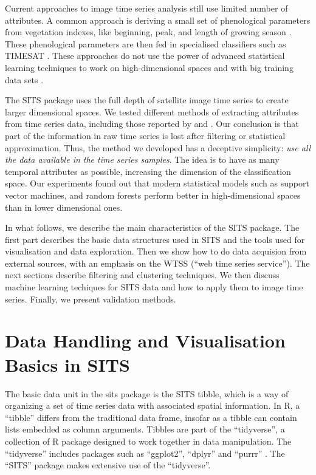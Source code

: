 \documentclass[11pt,]{article}
\begin{document}
Current approaches to image time series analysis still use limited
number of attributes. A common approach is deriving a small set of
phenological parameters from vegetation indexes, like beginning, peak,
and length of growing season \citep{Brown2013} \citep{Kastens2017}
\citep{Estel2015} \citep{Pelletier2016}. These phenological parameters
are then fed in specialised classifiers such as TIMESAT
\citep{Jonsson2004}. These approaches do not use the power of advanced
statistical learning techniques to work on high-dimensional spaces and
with big training data sets \citep{James2013}.

The SITS package uses the full depth of satellite image time series to
create larger dimensional spaces. We tested different methods of
extracting attributes from time series data, including those reported by
\citet{Pelletier2016} and \citet{Kastens2017}. Our conclusion is that
part of the information in raw time series is lost after filtering or
statistical approximation. Thus, the method we developed has a deceptive
simplicity:
\emph{use all the data available in the time series samples}. The idea
is to have as many temporal attributes as possible, increasing the
dimension of the classification space. Our experiments found out that
modern statistical models such as support vector machines, and random
forests perform better in high-dimensional spaces than in lower
dimensional ones.

In what follows, we describe the main characteristics of the SITS
package. The first part describes the basic data structures used in SITS
and the tools used for visualisation and data exploration. Then we show
how to do data acquision from external sources, with an emphasis on the
WTSS (``web time series service''). The next sections describe filtering
and clustering techniques. We then discuss machine learning techiques
for SITS data and how to apply them to image time series. Finally, we
present validation methods.

\section{Data Handling and Visualisation Basics in
SITS}\label{data-handling-and-visualisation-basics-in-sits}

The basic data unit in the sits package is the SITS tibble, which is a
way of organizing a set of time series data with associated spatial
information. In R, a ``tibble'' differs from the traditional data frame,
insofar as a tibble can contain lists embedded as column arguments.
Tibbles are part of the ``tidyverse'', a collection of R package
designed to work together in data manipulation. The ``tidyverse''
includes packages such as ``ggplot2'', ``dplyr'' and ``purrr''
\citep{Wickham2017}. The ``SITS'' package makes extensive use of the
``tidyverse''.
\end{document}
